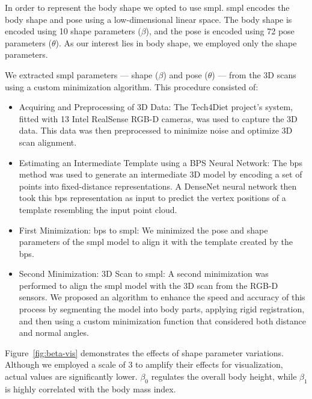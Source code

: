 In order to represent the body shape we opted to use \gls{smpl}. \gls{smpl}
encodes the body shape and pose using a low-dimensional linear space. The body
shape is encoded using 10 shape parameters ($\beta$), and the pose is encoded
using 72 pose parameters ($\theta$). As our interest lies in body shape, we
employed only the shape parameters.

We extracted \gls{smpl} parameters --- shape ($\beta$) and pose ($\theta$) ---
from the 3D scans using a custom minimization algorithm. This procedure
consisted of:

\begin{itemize}
    \item Acquiring and Preprocessing of 3D Data: The Tech4Diet project's system, fitted
          with 13 Intel RealSense RGB-D cameras, was used to capture the 3D data. This
          data was then preprocessed to minimize noise and optimize 3D scan alignment.

    \item Estimating an Intermediate Template using a BPS Neural Network: The \gls{bps}
          method was used to generate an intermediate 3D model by encoding a set of
          points into fixed-distance representations. A DenseNet neural network then took
          this \gls{bps} representation as input to predict the vertex positions of a
          template resembling the input point cloud.

    \item First Minimization: \gls{bps} to \gls{smpl}: We minimized the pose and shape
          parameters of the \gls{smpl} model to align it with the template created by the
          \gls{bps}.

    \item Second Minimization: 3D Scan to \gls{smpl}: A second minimization was performed
          to align the \gls{smpl} model with the 3D scan from the RGB-D sensors. We
          proposed an algorithm to enhance the speed and accuracy of this process by
          segmenting the model into body parts, applying rigid registration, and then
          using a custom minimization function that considered both distance and normal
          angles.
\end{itemize}

Figure~\ref{fig:beta-vis} demonstrates the effects of shape parameter
variations. Although we employed a scale of 3 to amplify their effects for
visualization, actual values are significantly lower. $\beta_0$ regulates the
overall body height, while $\beta_1$ is highly correlated with the body mass
index.

